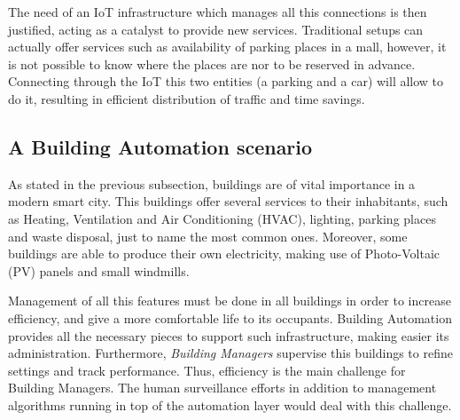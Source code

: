 The need of an IoT infrastructure which manages all this connections is then justified, acting as a catalyst to provide new services.
Traditional setups can actually offer services such as availability of parking places in a mall, however, it is not possible to know where the places are nor to be reserved in advance.
Connecting through the IoT this two entities (a parking and a car) will allow to do it, resulting in efficient distribution of traffic and time savings.

\subsection{A Building Automation scenario}
\label{sec:BAScenario}
As stated in the previous subsection, buildings are of vital importance in a modern smart city.
This buildings offer several services to their inhabitants, such as Heating, Ventilation and Air Conditioning (HVAC), lighting, parking places and waste disposal, just to name the most common ones.
Moreover, some buildings are able to produce their own electricity, making use of Photo-Voltaic (PV) panels and small windmills.

Management of all this features must be done in all buildings in order to increase efficiency, and give a more comfortable life to its occupants.
Building Automation provides all the necessary pieces to support such infrastructure, making easier its administration.
Furthermore, \textit{Building Managers} supervise this buildings to refine settings and track performance.
Thus, efficiency is the main challenge for Building Managers.
The human surveillance efforts in addition to management algorithms running in top of the automation layer would deal with this challenge.

